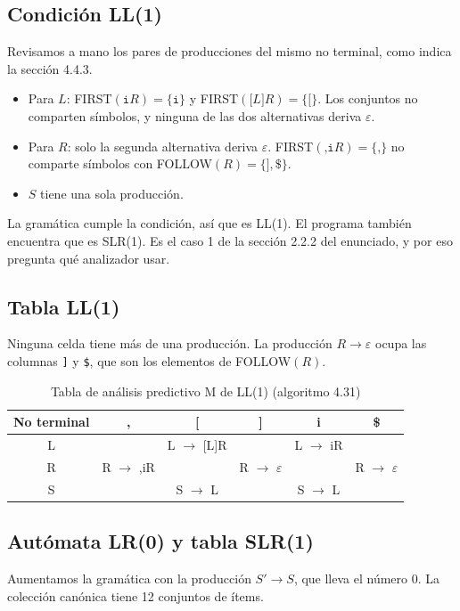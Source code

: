 \documentclass[11pt,a4paper]{article}
\begin{document}
\subsection{Condición LL(1)}
Revisamos a mano los pares de producciones del mismo no terminal, como indica la sección 4.4.3.
\begin{itemize}
\item Para $L$: FIRST$(\texttt{i}R)=\{\texttt{i}\}$ y FIRST$(\texttt{[}L\texttt{]}R)=\{\texttt{[}\}$. Los conjuntos no comparten símbolos, y ninguna de las dos alternativas deriva $\varepsilon$.
\item Para $R$: solo la segunda alternativa deriva $\varepsilon$. FIRST$(\texttt{,i}R)=\{\texttt{,}\}$ no comparte símbolos con FOLLOW$(R)=\{\texttt{]},\texttt{\$}\}$.
\item $S$ tiene una sola producción.
\end{itemize}
La gramática cumple la condición, así que es LL(1). El programa también encuentra que es SLR(1). Es el caso 1 de la sección 2.2.2 del enunciado, y por eso pregunta qué analizador usar.

\subsection{Tabla LL(1)}
Ninguna celda tiene más de una producción. La producción $R\to\varepsilon$ ocupa las columnas \texttt{]} y \texttt{\$}, que son los elementos de FOLLOW$(R)$.

\begin{table}[ht]
\centering
\small
\caption{Tabla de análisis predictivo M de LL(1) (algoritmo 4.31)}
\begin{tabular}{|c|c|c|c|c|c|}
\hline
No terminal & , & {[} & {]} & i & \$ \\ \hline
L &  & L $\to$ {[}L{]}R &  & L $\to$ iR &  \\ \hline
R & R $\to$ ,iR &  & R $\to$ $\varepsilon$ &  & R $\to$ $\varepsilon$ \\ \hline
S &  & S $\to$ L &  & S $\to$ L &  \\ \hline
\end{tabular}
\end{table}


\subsection{Autómata LR(0) y tabla SLR(1)}
Aumentamos la gramática con la producción $S'\to S$, que lleva el número 0. La colección canónica tiene 12 conjuntos de ítems.
\end{document}
